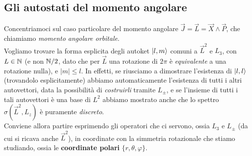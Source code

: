 \documentclass[../../FisicaTeorica.tex]{subfiles}
\begin{document}
\subsection{Gli autostati del momento angolare}
Concentriamoci sul caso particolare del momento angolare  $\vec{J}=\vec{L} = \vec{X}\land \vec{P}$, che chiamiamo \textit{momento angolare orbitale}.\\

Vogliamo trovare la forma esplicita degli autoket $\Ket{l,m}$ comuni a $\vec{L}^2$ e $L_3$, con $L\in \mathbb{N}$ (e non $\mathbb{N}/2$, dato che per $\vec{L}$  una rotazione di $2\pi$ è \textit{equivalente} a una rotazione nulla), e $|m| \leq l$. In effetti, se riusciamo a dimostrare l'esistenza di $\Ket{l,l}$ (trovandolo esplicitamente) abbiamo automaticamente l'esistenza di tutti i altri autovettori, data la possibilità di \textit{costruirli} tramite $L_\pm$, e se l'insieme di tutti i tali autovettori è una base di $L^2$ abbiamo mostrato anche che lo spettro $\sigma(\vec{L}^2, L_z)$ è puramente \textit{discreto}.\\

Conviene allora partire esprimendo gli operatori che ci servono, ossia $L_3$ e $L_\pm$ (da cui si ricava anche $\vec{L}^2$), in coordinate  con la simmetria rotazionale che stiamo studiando, ossia le \textbf{coordinate polari} $\{r,\theta,\varphi\}$.\\
 
\end{document}
